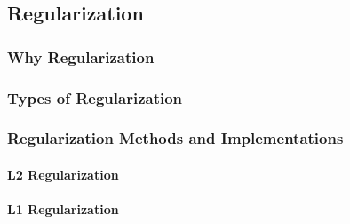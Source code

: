 \subsection{Regularization}

\subsubsection{Why Regularization}

\subsubsection{Types of Regularization}

\subsubsection{Regularization Methods and Implementations}

\paragraph{L2 Regularization}

\paragraph{L1 Regularization}